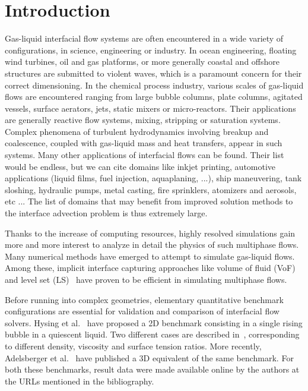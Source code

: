 \documentclass[review]{elsarticle}
\begin{document}
\linenumbers

\section{Introduction}

Gas-liquid interfacial flow systems are often encountered in a wide variety of configurations, in science, engineering or industry. In ocean engineering, floating wind turbines, oil and gas platforms, or more generally coastal and offshore structures are submitted to violent waves, which is a paramount concern for their correct dimensioning. In the chemical process industry, various scales of gas-liquid flows are encountered ranging from large bubble columns, plate columns, agitated vessels, surface aerators, jets, static mixers or micro-reactors. Their applications are generally reactive flow systems, mixing, stripping or saturation systems. Complex phenomena of turbulent hydrodynamics involving breakup and coalescence, coupled with gas-liquid mass and heat transfers, appear in such systems. Many other applications of interfacial flows can be found. Their list would be endless, but we can cite domains like inkjet printing, automotive applications (liquid films, fuel injection, aquaplaning, ...), ship maneuvering, tank sloshing, hydraulic pumps, metal casting, fire sprinklers, atomizers and aerosols, etc ... The list of domains that may benefit from improved solution methods to the interface advection problem is thus extremely large. 

Thanks to the increase of computing resources, highly resolved simulations gain more and more 
interest to analyze in detail the physics of such multiphase flows. Many numerical methods 
have emerged to attempt to simulate gas-liquid flows. Among these, implicit interface capturing 
approaches like volume of fluid (VoF)~\cite{HIRT1981201} and level set (LS)~\cite{OSHER198812} 
have proven to be efficient in simulating multiphase flows. 

Before running into complex geometries, elementary quantitative benchmark configurations are 
essential for validation and comparison of interfacial flow solvers. Hysing et 
al.~\cite{Hysing2009} have proposed a 2D benchmark consisting in a single rising bubble in 
a quiescent liquid. Two different cases are described in~\cite{Hysing2009}, corresponding to 
different density, viscosity and surface tension ratios. More recently, Adelsberger et al.~\cite{Adelsberger2014} have published a 3D equivalent of the same benchmark. For both these benchmarks, result data were made available online by the authors at the URLs mentioned in the bibliography. 
\end{document}
